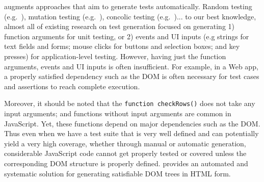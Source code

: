 \tool augments approaches that aim to generate tests automatically.  
Random testing (e.g.~\cite{artemis}), mutation testing (e.g.~\cite{pythia}), concolic testing (e.g.~\cite{eventConcolic, feedbackConcolic, kudzu, jalangi, cute})... 
to our best knowledge, almost all of existing research on test generation focused on generating 1) function arguments for unit testing, or 2) events and UI inputs (e.g strings for text fields and forms; mouse clicks for buttons and selection boxes; and key presses) for application-level testing.  
However, having just the function arguments, events and UI inputs is often insufficient.  
For example, in a Web app, a properly satisfied dependency such as the DOM is often necessary for test cases and assertions to reach complete execution.  

Moreover, it should be noted that the {\tt function checkRows()} does not take any input arguments; and functions without input arguments are common in JavaScript.
Yet, these functions depend on major dependencies such as the DOM.
Thus even when we have a test suite that is very well defined and can potentially yield a very high coverage, whether through manual or automatic generation, 
considerable JavaScript code cannot get properly tested or covered unless the corresponding DOM structure is properly defined.  
\tool provides an automated and systematic solution for generating satisfiable DOM trees in HTML form.  


